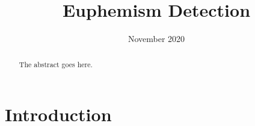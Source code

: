 \newif\ifanonymized\anonymizedfalse  %
\newif\ifroughdraft\roughdrafttrue   %



\graphicspath{{figures/}}

\ifroughdraft
\newcommand{\kibitz}[3]
  {\textcolor[HTML]{#1}{[\textbf{#2}\ifx&#3&\else: \textit{#3}\fi]}}
\else
\newcommand{\kibitz}[3]{}
\fi
\newcommand{\todo}[1]{\kibitz{e7298a}{TODO}{#1}}
\newcommand{\needcite}[1]{\kibitz{e7298a}{citation needed}{#1}}
\newcommand{\needxref}[1]{\kibitz{e7298a}{xref needed}{#1}}

\newcommand{\GF}[1]{\kibitz{1b9e77}{GF}{#1}}
\newcommand{\NC}[1]{\kibitz{d95f02}{NC}{#1}}
\newcommand{\SB}[1]{\kibitz{7570b3}{SB}{#1}}
\newcommand{\WZ}[1]{\kibitz{66a61e}{WZ}{#1}}
\newcommand{\ZW}[1]{\kibitz{e6ab02}{ZW}{#1}}

\let\needref=\needxref
\let\nicolasc=\NC

\title{Euphemism Detection}
\author{%
\ifanonymized
\IEEEauthorblockN{Anonymous submission}
\else
{}
\and
{}
\and
{}
\and
{}
\and
{}
\fi}
\date{November 2020}



\maketitle

\begin{abstract}
The abstract goes here.
\end{abstract}

\section{Introduction}

